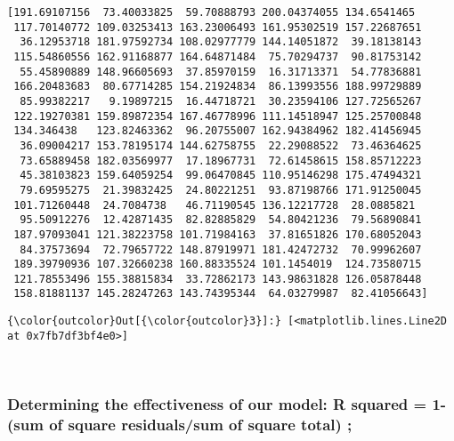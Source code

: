 \documentclass[11pt]{article}
\begin{document}
    \begin{Verbatim}[commandchars=\\\{\}]
[191.69107156  73.40033825  59.70888793 200.04374055 134.6541465
 117.70140772 109.03253413 163.23006493 161.95302519 157.22687651
  36.12953718 181.97592734 108.02977779 144.14051872  39.18138143
 115.54860556 162.91168877 164.64871484  75.70294737  90.81753142
  55.45890889 148.96605693  37.85970159  16.31713371  54.77836881
 166.20483683  80.67714285 154.21924834  86.13993556 188.99729889
  85.99382217   9.19897215  16.44718721  30.23594106 127.72565267
 122.19270381 159.89872354 167.46778996 111.14518947 125.25700848
 134.346438   123.82463362  96.20755007 162.94384962 182.41456945
  36.09004217 153.78195174 144.62758755  22.29088522  73.46364625
  73.65889458 182.03569977  17.18967731  72.61458615 158.85712223
  45.38103823 159.64059254  99.06470845 110.95146298 175.47494321
  79.69595275  21.39832425  24.80221251  93.87198766 171.91250045
 101.71260448  24.7084738   46.71190545 136.12217728  28.0885821
  95.50912276  12.42871435  82.82885829  54.80421236  79.56890841
 187.97093041 121.38223758 101.71984163  37.81651826 170.68052043
  84.37573694  72.79657722 148.87919971 181.42472732  70.99962607
 189.39790936 107.32660238 160.88335524 101.1454019  124.73580715
 121.78553496 155.38815834  33.72862173 143.98631828 126.05878448
 158.81881137 145.28247263 143.74395344  64.03279987  82.41056643]

    \end{Verbatim}

\begin{Verbatim}[commandchars=\\\{\}]
{\color{outcolor}Out[{\color{outcolor}3}]:} [<matplotlib.lines.Line2D at 0x7fb7df3bf4e0>]
\end{Verbatim}
            
    \begin{center}
    \end{center}
    { \hspace*{\fill} \\}
    
    \hypertarget{determining-the-effectiveness-of-our-model-r-squared-1-sum-of-square-residualssum-of-square-total}{%
\subsubsection{Determining the effectiveness of our model: R squared =
1-(sum of square residuals/sum of square total)
;}\label{determining-the-effectiveness-of-our-model-r-squared-1-sum-of-square-residualssum-of-square-total}}
\end{document}
